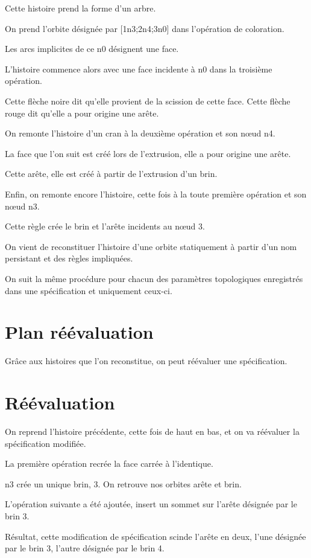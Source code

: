 \documentclass[11pt]{article}
\begin{document}
Cette histoire prend la forme d'un arbre.

On prend l'orbite désignée par [1n3;2n4;3n0] dans l'opération de coloration.

Les arcs implicites de ce n0 désignent une face.

L'histoire commence alors avec une face incidente à n0 dans la troisième opération.

Cette flèche noire dit qu'elle provient de la scission de cette face. %
Cette flèche rouge dit qu'elle a pour origine une arête.

On remonte l'histoire d'un cran à la deuxième opération et son nœud n4.

La face que l'on suit est créé lors de l'extrusion, elle a pour origine une
arête.

Cette arête, elle est créé à partir de l'extrusion d'un brin.

Enfin, on remonte encore l'histoire, cette fois à la toute première opération et son nœud n3.

Cette règle crée le brin et l'arête incidents au nœud 3.

On vient de reconstituer l'histoire d'une orbite statiquement à partir d'un nom
persistant et des règles impliquées.

On suit la même procédure pour chacun des paramètres topologiques enregistrés dans une spécification et uniquement ceux-ci.

\section{Plan réévaluation}
\label{sec:org04c39be}

Grâce aux histoires que l'on reconstitue, on peut réévaluer une spécification.

\section{Réévaluation}
\label{sec:org3b38850}

On reprend l'histoire précédente, cette fois de haut en bas, et on va réévaluer
la spécification modifiée. %

La première opération recrée la face carrée à l'identique.

n3 crée un unique brin, 3. On retrouve nos orbites arête et brin.

L'opération suivante a été ajoutée, insert un sommet sur l'arête désignée par
le brin 3.

Résultat, cette modification de spécification scinde l'arête en deux, l'une
désignée par le brin 3, l'autre désignée par le brin 4.
\end{document}
